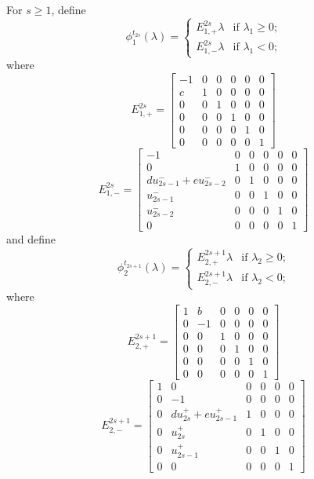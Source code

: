 \documentclass{amsart}
\numberwithin{theorem}{section}
\begin{document}
  For $s\ge1$, define 
  \begin{equation}
    \label{eq:even positive mutation map definition}
    \phi^{t_{2s}}_1(\lambda)=\begin{cases} E^{2s}_{1,+}\lambda & \text{if $\lambda_1\ge0$;}\\ E^{2s}_{1,-}\lambda & \text{if $\lambda_1<0$;}\end{cases}
  \end{equation}
  where
  \[E^{2s}_{1,+}=\left[\begin{array}{cccccc} -1 & 0 & 0 & 0 & 0 & 0 \\ c & 1 & 0 & 0 & 0 & 0\\ 0 & 0 & 1 & 0 & 0 & 0\\ 0 & 0 & 0 & 1 & 0 & 0\\ 0 & 0 & 0 & 0 & 1 & 0\\ 0 & 0 & 0 & 0 & 0 &  1\end{array}\right]\]
  \[E^{2s}_{1,-}=\left[\begin{array}{cccccc} -1 & 0 & 0 & 0 & 0 & 0 \\ 0 & 1 & 0 & 0 & 0 & 0\\ du_{2s-1}^- + eu_{2s-2}^- & 0 & 1 & 0 & 0 & 0\\ u_{2s-1}^- & 0 & 0 & 1 & 0 & 0\\ u_{2s-2}^- & 0 & 0 & 0 & 1 & 0\\ 0 & 0 & 0 & 0 & 0 &  1\end{array}\right]\]
  and define
  \begin{equation}
    \label{eq:odd positive mutation map definition}
    \phi^{t_{2s+1}}_2(\lambda)=\begin{cases} E^{2s+1}_{2,+}\lambda & \text{if $\lambda_2\ge0$;}\\ E^{2s+1}_{2,-}\lambda & \text{if $\lambda_2<0$;}\end{cases}
  \end{equation}
  where
  \[E^{2s+1}_{2,+}=\left[\begin{array}{cccccc} 1 & b & 0 & 0 & 0 & 0 \\ 0 & -1 & 0 & 0 & 0 & 0\\ 0 & 0 & 1 & 0 & 0 & 0\\ 0 & 0 & 0 & 1 & 0 & 0\\ 0 & 0 & 0 & 0 & 1 & 0\\ 0 & 0 & 0 & 0 & 0 &  1\end{array}\right]\]
  \[E^{2s+1}_{2,-}=\left[\begin{array}{cccccc} 1 & 0 & 0 & 0 & 0 & 0 \\ 0 & -1 & 0 & 0 & 0 & 0\\ 0 & du_{2s}^+ + eu_{2s-1}^+  & 1 & 0 & 0 & 0\\ 0 & u_{2s}^+ & 0 & 1 & 0 & 0\\ 0 & u_{2s-1}^+ & 0 & 0 & 1 & 0\\ 0 & 0 & 0 & 0 & 0 &  1\end{array}\right]\]
\end{document}
